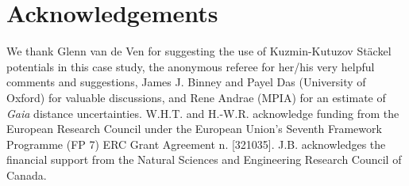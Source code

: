 \documentclass[iop,revtex4,numberedappendix,appendixfloats]{emulateapj}
\begin{document}
\section{Acknowledgements}

We thank Glenn van de Ven for suggesting the use of Kuzmin-Kutuzov St\"{a}ckel potentials in this case study, the anonymous referee for her/his very helpful comments and suggestions, James J. Binney and Payel Das (University of Oxford) for valuable discussions, and Rene Andrae (MPIA) for an estimate of \emph{Gaia} distance uncertainties. W.H.T. and H.-W.R. acknowledge funding from the European Research Council under the European Union's Seventh Framework Programme (FP 7) ERC Grant Agreement n. [321035]. J.B. acknowledges the financial support from the Natural Sciences and Engineering Research Council of Canada. 

{}

\end{document}
